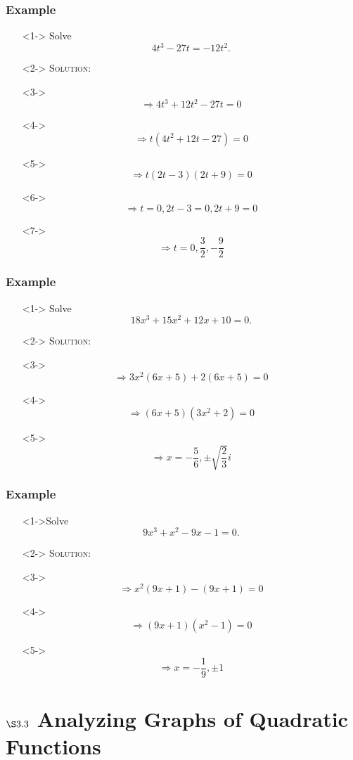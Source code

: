 \documentclass[handout]{beamer}
\begin{document}
\begin{frame}
	\frametitle{Example}
	\begin{enumerate}
		\item[]<1-> Solve \[ 4t^{3}-27t=-12t^{2}. \]
		\item[]<2-> \textsc{Solution:}
		\item[]<3-> \[ \Rightarrow 4t^{3}+12t^{2}-27t=0 \]
		\item[]<4-> \[ \Rightarrow t(4t^{2}+12t-27)=0 \]
		\item[]<5-> \[ \Rightarrow t(2t-3)(2t+9)=0 \]
		\item[]<6-> \[ \Rightarrow t=0, 2t-3=0, 2t+9=0 \]
		\item[]<7-> \[ \Rightarrow t=0, \frac{3}{2}, -\frac{9}{2} \]
	\end{enumerate}
\end{frame}

\begin{frame}
	\frametitle{Example}
	\begin{enumerate}
		\item[]<1-> Solve \[ 18x^{3}+15x^{2}+12x+10=0. \]
		\item[]<2-> \textsc{Solution:}
		\item[]<3-> \[ \Rightarrow 3x^{2}(6x+5)+2(6x+5)=0 \]
		\item[]<4-> \[ \Rightarrow (6x+5)(3x^{2}+2)=0 \]
		\item[]<5-> \[ \Rightarrow x=-\frac{5}{6}, \pm \sqrt{\frac{2}{3}} i \]
	\end{enumerate}
\end{frame}

\begin{frame}
	\frametitle{Example}
	\begin{enumerate}
		\item[]<1->Solve \[ 9x^{3}+x^{2}-9x-1=0. \]
		\item[]<2-> \textsc{Solution:}
		\item[]<3-> \[ \Rightarrow x^{2}(9x+1)-(9x+1)=0\]
		\item[]<4-> \[ \Rightarrow (9x+1)(x^{2}-1)=0 \]
		\item[]<5-> \[ \Rightarrow x=-\frac{1}{9}, \pm 1 \]
	\end{enumerate}
\end{frame}

\section{$\S3.3$ Analyzing Graphs of Quadratic Functions}
\end{document}
